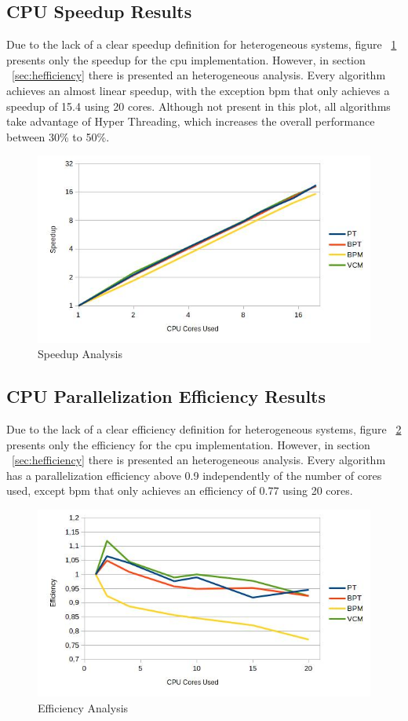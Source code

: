 \subsection{CPU Speedup Results}

Due to the lack of a clear speedup definition for heterogeneous systems, figure ~\ref{img:speedup} presents only the speedup for the \gls{cpu} implementation. However, in section ~\ref{sec:hefficiency} there is presented an heterogeneous analysis. Every algorithm achieves an almost linear speedup, with the exception \gls{bpm} that only achieves a speedup of 15.4 using 20 cores. Although not present in this plot, all algorithms take advantage of Hyper Threading, which increases the overall performance between 30\% to 50\%.

\begin{figure}[H]
\centering
\includegraphics[width=0.8\linewidth]{img/speedup.jpg}
\caption{\label{img:speedup} Speedup Analysis}
\end{figure}

\subsection{CPU Parallelization Efficiency Results}

Due to the lack of a clear efficiency definition for heterogeneous systems, figure ~\ref{img:efficiency} presents only the efficiency for the \gls{cpu} implementation. However, in section ~\ref{sec:hefficiency} there is presented an heterogeneous analysis. Every algorithm has a parallelization efficiency above 0.9 independently of the number of cores used, except \gls{bpm} that only achieves an efficiency of 0.77 using 20 cores.

\begin{figure}[H]
\centering
\includegraphics[width=0.8\linewidth]{img/efficiency.jpg}
\caption{\label{img:efficiency} Efficiency Analysis}
\end{figure}

